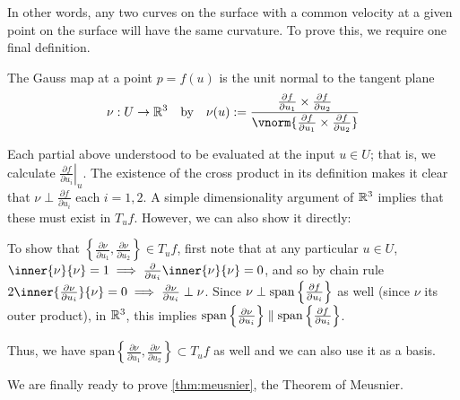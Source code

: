 	
	In other words, any two curves on the surface with a common velocity at a given point on the surface will have the same curvature. To prove this, we require one final definition.
	
	\begin{defn} \label{def:gauss-map}
		The Gauss map at a point $p = f(u)$ is the unit normal to the tangent plane
		\[\nu : U \to \R^3 \quad\textrm{by}\quad  \nu(u) :=
		\frac{\frac{\partial f}{\partial u_1} \times \frac{\partial f}{\partial u_2}}
		{\vnorm{\frac{\partial f}{\partial u_1} \times \frac{\partial f}{\partial u_2}}} \]
	\end{defn}
	Each partial above understood to be evaluated at the input $u \in U$; that is, we calculate $\left.\frac{\partial f}{\partial u_i}\right|_u$.
	The existence of the cross product in its definition makes it clear that $\nu \perp \frac{\partial f}{\partial u_i}$ each $i=1,2$. A simple dimensionality argument of $\mathbb{R}^3$ implies that these must exist in $T_uf$. However, we can also show it directly: 
	
	To show that $\left\{\frac{\partial \nu}{\partial u_1} , \frac{\partial \nu}{\partial u_2}\right\} \in T_u f$,
	first note that at any particular $u \in U$,
	$\inner{\nu}{\nu} = 1 \implies \frac{\partial}{\partial u_i} \inner{\nu}{\nu} = 0$,
	and so by chain rule $2\inner{\frac{\partial \nu}{\partial u_i}}{\nu} = 0
	\implies \frac{\partial \nu}{\partial u_i} \perp \nu $.
	Since $ \nu \perp \mathrm{span}\left\{\frac{\partial f}{\partial u_i}\right\} $ as well (since $\nu$ its outer product), in  $\mathbb{R}^3$, this implies
	$\mathrm{span}\left\{\frac{\partial \nu}{\partial u_i}\right\} \parallel
	\mathrm{span}\left\{\frac{\partial f}{\partial u_i}\right\}$.
	
	Thus, we have $\textrm{span}\left\{ \frac{\partial \nu}{\partial u_1}, \frac{\partial \nu}{\partial u_2}\right\} \subset T_u f$ as well and we can also use it as a basis.
	
	
	We are finally ready to prove \cref{thm:meusnier}, the Theorem of Meusnier.
	

